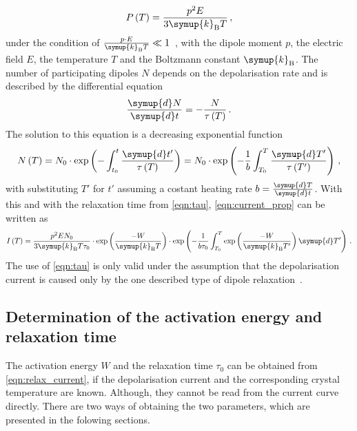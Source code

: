 \begin{equation}
    P\left(T\right) = \frac{p^2E}{3\symup{k}_{\mathrm{B}}T}\,,
\end{equation}
under the condition of $ \frac{p\cdot E}{\symup{k}_{\mathrm{B}}T} \ll 1$~\cite[184]{JacksonV2}, with the dipole moment $p$, the electric field $E$, the temperature $T$ and the Boltzmann constant $\symup{k}_{\mathrm{B}}$.
\newline\noindent
The number of participating dipoles $N$ depends on the depolarisation rate and is described by the differential equation
\begin{equation}
    \frac{\symup{d}N}{\symup{d}t} = -\frac{N}{\tau\left(T\right)}\,.
    \label{eqn:relax}
\end{equation}
The solution to this equation is a decreasing exponential function
\begin{equation*}
    N\left(T\right) = N_0\cdot\exp\left(-\int_{t_0}^t \frac{\symup{d}t'}{\tau\left(T\right)}\right) = N_0\cdot\exp\left(-\frac{1}{b}\int_{T_0}^T \frac{\symup{d}T'}{\tau\left(T'\right)}\right)\,,
\end{equation*}
%
with substituting $T'$ for $t'$ assuming a costant heating rate $b = \frac{\symup{d}T}{\symup{d}t}$.
\newline\noindent
With this and with the relaxation time from \autoref{eqn:tau}, \autoref{eqn:current_prop} can be written as
\begin{equation}
    I\left(T\right) = \frac{p^2EN_0}{3\symup{k}_{\mathrm{B}}T\tau_0}\cdot\exp\left(\frac{-W}{\symup{k}_{\mathrm{B}}T}\right)\cdot\exp\left(-\frac{1}{b\tau_0}\int_{T_0}^T \exp\left(\frac{-W}{\symup{k}_{\mathrm{B}}T'}\right)\symup{d}T'\right)\,.
\label{eqn:relax_current}
\end{equation}
The use of \autoref{eqn:tau} is only valid under the assumption that the depolarisation current is caused only by the one described type of dipole relaxation~\cite[582]{muccillo_1974}.
%
%
\subsection{Determination of the activation energy and relaxation time}
The activation energy $W$ and the relaxation time $\tau_0$ can be obtained from \autoref{eqn:relax_current}, if the depolarisation current and the corresponding crystal temperature are known.
Although, they cannot be read from the current curve directly.
There are two ways of obtaining the two parameters, which are presented in the folowing sections.
